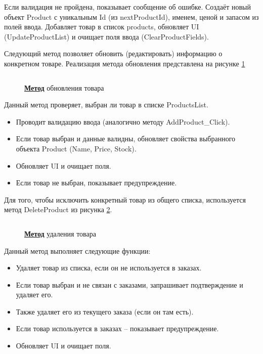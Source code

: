 \documentclass[12pt]{article}
\newcommand{\colorGIT}[1]{\textbf{#1}}
\renewcommand{\texttt}[1]{{\small\ttfamily #1}}
\numberwithin{listing}{section}
\numberwithin{figure}{section}
\begin{document}
Если валидация не пройдена, показывает сообщение об ошибке. Создаёт новый объект \texttt{Product} с уникальным \texttt{Id} (из \texttt{nextProductId}), именем, ценой и запасом из полей ввода. Добавляет товар в список \texttt{products}, обновляет \texttt{UI} (\texttt{Update\-ProductList}) и очищает поля ввода (\texttt{Clear\-ProductFields}).

Следующий метод позволяет обновить (редактировать) информацию о конкретном товаре. Реализация метода обновления представлена на рисунке \ref{fig:MethodUpdate}

\begin{figure}[H]
	\centering
	\inputminted[firstline=82, lastline=110]{csharp}{../../3lab/StoreManager/MainWindow.xaml.cs}
	\caption{\colorGIT{\href{https://github.com/WebMasterIT/Csharp_Labs/blob=ec375afd16c0647b337cf3d8a79c8bef904fc1be/3lab/StoreManager/MainWindow.xaml.cs\#L82-L110}{Метод}} обновления товара}
	\label{fig:MethodUpdate}
\end{figure}

\noindent Данный метод проверяет, выбран ли товар в списке \texttt{ProductsList}.
\begin{itemize}
	\item Проводит валидацию ввода (аналогично методу \texttt{AddProduct\_Click}).
	\item Если товар выбран и данные валидны, обновляет свойства выбранного объекта \texttt{Product} (\texttt{Name}, \texttt{Price}, \texttt{Stock}).
	\item Обновляет \texttt{UI} и очищает поля.
	\item Если товар не выбран, показывает предупреждение.
\end{itemize}

Для того, чтобы исключить конкретный товар из общего списка, используется метод \texttt{Delete\-Product} из рисунка \ref{fig:MethodDelete}.


\begin{figure}[H]
	\centering
	\inputminted[firstline=112, lastline=141]{csharp}{../../3lab/StoreManager/MainWindow.xaml.cs}
	\caption{\colorGIT{\href{https://github.com/WebMasterIT/Csharp_Labs/blob=ec375afd16c0647b337cf3d8a79c8bef904fc1be/3lab/StoreManager/MainWindow.xaml.cs\#L112-L141}{Метод}} удаления товара}
	\label{fig:MethodDelete}
\end{figure}

\noindent Данный метод выполняет следующие функции:
\begin{itemize}
	\item Удаляет товар из списка, если он не используется в заказах.
	\item Если товар выбран и не связан с заказами, запрашивает подтверждение и удаляет его.
	\item Также удаляет его из текущего заказа (если он там есть).
	\item Если товар используется в заказах -- показывает предупреждение.
	\item Обновляет \texttt{UI} и очищает поля.
\end{itemize}
\end{document}
